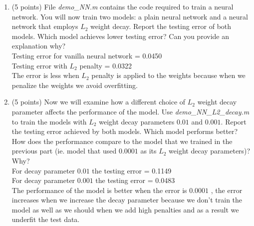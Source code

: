 \documentclass[english]{article}
\begin{document}
\begin{enumerate}
\item (5 points) File \textit{demo\_NN.m} contains the code required to train a neural network. You will now train two models: a plain neural network and a neural network that employs $L_2$ weight decay. Report the testing error of both models. Which model achieves lower testing error? Can you provide an explanation why? \\
Testing error for vanilla neural network = 0.0450 \\
Testing error with $L_2$ penalty = 0.0322 \\
The error is less when $L_2$ penalty is applied to the weights because when we penalize the weights we avoid overfitting. \\


\item (5 points) Now we will examine how a different choice of $L_2$ weight decay parameter affects the performance of the model. Use  \textit{demo\_NN\_L2\_decay.m} to train the models with $L_2$ weight decay parameters $0.01$ and $0.001$. Report the testing error achieved by both models. Which model performs better? How does the performance compare to the model that we trained in the previous part (ie. model that used $0.0001$ as its $L_2$ weight decay parameters)? Why? \\
For decay parameter $0.01$ the testing error = 0.1149 \\
For decay parameter $0.001$ the testing error = 0.0483 \\
The performance of the model is better when the error is $0.0001$ , the error increases when we increase the decay parameter because we don't train the model as well as we should when we add high penalties and as a result we underfit the test data. \\



\end{enumerate}
\end{document}
